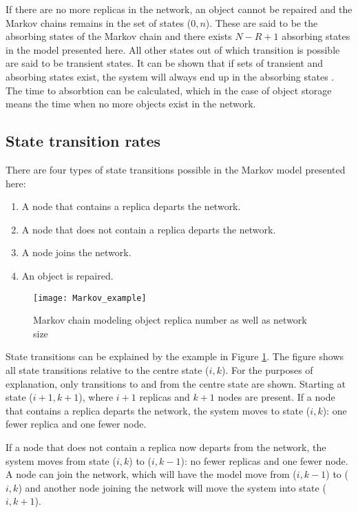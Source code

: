 If there are no more replicas in the network, an object cannot be repaired and the Markov chains remains in the set of states ($0,n$). These are said to be the absorbing states of the Markov chain and there exists $N - R + 1$ absorbing states in the model presented here. All other states out of which transition is possible are said to be transient states. It can be shown that if sets of transient and absorbing states exist, the system will always end up in the absorbing states \cite{grinstead1997introduction_probability}. The time to absorbtion can be calculated, which in the case of object storage means the time when no more objects exist in the network.

\subsection{State transition rates}

There are four types of state transitions possible in the Markov model presented here:
%
\begin{enumerate}
\item A node that contains a replica departs the network.
\item A node that does not contain a replica departs the network.
\item A node joins the network.
\item An object is repaired.
\end{enumerate}


\begin{figure}[htbp]
 \centering
 \texttt{[image: Markov\_example]}
 \caption{Markov chain modeling object replica number as well as network size}
 \label{fig_markov_example}
\end{figure}

State transitions can be explained by the example in Figure \ref{fig_markov_example}. The figure shows all state transitions relative to the centre state ($i,k$). For the purposes of explanation, only transitions to and from the centre state are shown. Starting at state ($i+1,k+1$), where $i+1$ replicas and $k+1$ nodes are present. If a node that contains a replica departs the network, the system moves to state ($i,k$): one fewer replica and one fewer node.

If a node that does not contain a replica now departs from the network, the system moves from state ($i,k$) to ($i,k-1$): no fewer replicas and one fewer node. A node can join the network, which will have the model move from ($i,k-1$) to ($i,k$) and another node joining the network will move the system into state ($i,k+1$).


